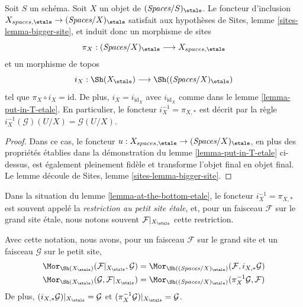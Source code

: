 \begin{lemma}
\label{lemma-at-the-bottom-etale}
Soit $S$ un schéma. Soit $X$ un objet de $(\textit{Spaces}/S)_\etale$.
Le foncteur d'inclusion $X_{spaces, \etale} \to (\textit{Spaces}/X)_\etale$
satisfait aux hypothèses de Sites, lemme \ref{sites-lemma-bigger-site},
et induit donc un morphisme de sites
$$
\pi_X :
(\textit{Spaces}/X)_\etale
\longrightarrow
X_{spaces, \etale}
$$
et un morphisme de topos
$$
i_X :
\Sh(X_\etale)
\longrightarrow
\Sh((\textit{Spaces}/X)_\etale)
$$
tel que $\pi_X \circ i_X = \text{id}$. De plus, $i_X = i_{\text{id}_X}$
avec $i_{\text{id}_X}$ comme dans le lemme \ref{lemma-put-in-T-etale}.
En particulier, le foncteur $i_X^{-1} = \pi_{X, *}$ est décrit par la règle
$i_X^{-1}(\mathcal{G})(U/X) = \mathcal{G}(U/X)$.
\end{lemma}

\begin{proof}
Dans ce cas, le foncteur
$u : X_{spaces, \etale} \to (\textit{Spaces}/X)_\etale$,
en plus des propriétés établies dans la démonstration du
lemme \ref{lemma-put-in-T-etale} ci-dessus, est également pleinement fidèle
et transforme l'objet final en objet final.
Le lemme découle de Sites, lemme \ref{sites-lemma-bigger-site}.
\end{proof}

\begin{definition}
\label{definition-restriction-small-etale}
Dans la situation du lemme \ref{lemma-at-the-bottom-etale},
le foncteur $i_X^{-1} = \pi_{X, *}$ est souvent
appelé la {\it restriction au petit site \'etale}, et, pour un faisceau
$\mathcal{F}$ sur le grand site \'etale, nous notons souvent
$\mathcal{F}|_{X_\etale}$ cette restriction.
\end{definition}

\noindent
Avec cette notation, nous avons, pour un faisceau $\mathcal{F}$ sur le
grand site et un faisceau $\mathcal{G}$ sur le petit site,
\begin{align*}
\Mor_{\Sh(X_\etale)}(
\mathcal{F}|_{X_\etale},
\mathcal{G})
& =
\Mor_{\Sh((\textit{Spaces}/X)_\etale)}(
\mathcal{F},
i_{X, *}\mathcal{G}) \\
\Mor_{\Sh(X_\etale)}(
\mathcal{G},
\mathcal{F}|_{X_\etale})
& =
\Mor_{\Sh((\textit{Spaces}/X)_\etale)}(
\pi_X^{-1}\mathcal{G},
\mathcal{F})
\end{align*}
De plus, $(i_{X, *}\mathcal{G})|_{X_\etale} = \mathcal{G}$
et $(\pi_X^{-1}\mathcal{G})|_{X_\etale} = \mathcal{G}$.

